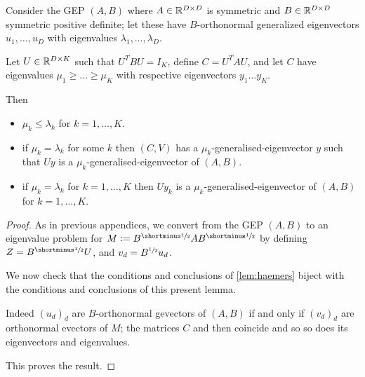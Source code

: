 \begin{corollary}\label{cor:generalised-eigenvalue-interlacing}
Consider the GEP $(A, B)$ where $A \in \mathbb{R}^{D \times D}$ is symmetric and $B \in \mathbb{R}^{D \times D}$ symmetric positive definite; let these have $B$-orthonormal generalized eigenvectors $u_1, \dots, u_D$ with eigenvalues $\lambda_1, \dots, \lambda_D$.

Let $U \in \mathbb{R}^{D \times K}$ such that $U^T B U = I_K$, define $C = U^T A U$, and let $C$ have eigenvalues $\mu_1 \geq \dots \geq \mu_K$ with respective eigenvectors $y_1 \dots y_K$.

Then
\begin{itemize}
    \item $\mu_k \leq \lambda_k$ for $k=1,\dots,K$.
    \item if $\mu_k = \lambda_k$ for some $k$ then $(C,V)$ has a $\mu_k$-generalised-eigenvector $y$ such that $Uy$ is a $\mu_k$-generalised-eigenvector of $(A,B)$.
    \item if $\mu_k = \lambda_k$ for $k=1,\dots,K$ then $Uy_k$ is a $\mu_k$-generalised-eigenvector of $(A,B)$ for $k=1,\dots,K$.
\end{itemize}
\end{corollary}
\begin{proof}
    As in previous appendices, we convert from the GEP $(A,B)$ to an eigenvalue problem for $M \defeq B^\mhalf A B^\mhalf$ by defining $Z = B^\mhalf U$, and $v_d = B^{\sfrac{1}{2}} u_d$.

    We now check that the conditions and conclusions of \cref{lem:haemers} biject with the conditions and conclusions of this present lemma.

    Indeed $(u_d)_d$ are $B$-orthonormal gevectors of $(A,B)$ if and only if $(v_d)_d$ are orthonormal evectors of $M$; the matrices $C$ and then coincide and so so does its eigenvectors and eigenvalues.

    This proves the result.
\end{proof}


